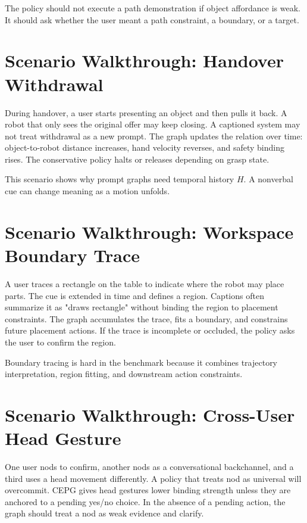 \documentclass{article}
\newcommand{\method}{CEPG}
\begin{document}
The policy should not execute a path demonstration if object affordance is weak. It should ask whether the user meant a path constraint, a boundary, or a target.

\section{Scenario Walkthrough: Handover Withdrawal}

During handover, a user starts presenting an object and then pulls it back. A robot that only sees the original offer may keep closing. A captioned system may not treat withdrawal as a new prompt. The graph updates the relation over time: object-to-robot distance increases, hand velocity reverses, and safety binding rises. The conservative policy halts or releases depending on grasp state.

This scenario shows why prompt graphs need temporal history $H$. A nonverbal cue can change meaning as a motion unfolds.

\section{Scenario Walkthrough: Workspace Boundary Trace}

A user traces a rectangle on the table to indicate where the robot may place parts. The cue is extended in time and defines a region. Captions often summarize it as "draws rectangle" without binding the region to placement constraints. The graph accumulates the trace, fits a boundary, and constrains future placement actions. If the trace is incomplete or occluded, the policy asks the user to confirm the region.

Boundary tracing is hard in the benchmark because it combines trajectory interpretation, region fitting, and downstream action constraints.

\section{Scenario Walkthrough: Cross-User Head Gesture}

One user nods to confirm, another nods as a conversational backchannel, and a third uses a head movement differently. A policy that treats nod as universal will overcommit. \method{} gives head gestures lower binding strength unless they are anchored to a pending yes/no choice. In the absence of a pending action, the graph should treat a nod as weak evidence and clarify.
\end{document}
